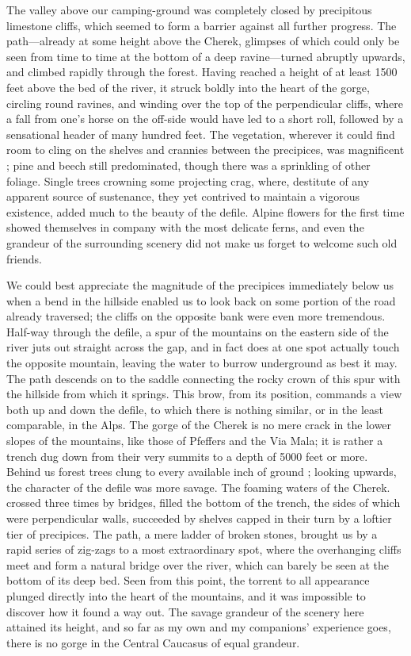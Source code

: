 \documentclass{article}
\begin{document}
	The valley above our camping-ground was completely closed by precipitous limestone cliffs, which seemed to form a barrier against all further progress. The path—already at some height above the Cherek, glimpses of which could only be seen from time to time at the bottom of a deep ravine—turned abruptly upwards, and climbed rapidly through the forest. Having reached a height of at least 1500 feet above the bed of the river, it struck boldly into the heart of the gorge, circling round ravines, and winding over the top of the perpendicular cliffs, where a fall from one's horse on the off-side would have led to a short roll, followed by a sensational header of many hundred feet. The vegetation, wherever it could find room to cling on the shelves and crannies between the precipices, was magnificent ; pine and beech still predominated, though there was a sprinkling of other foliage. Single trees crowning some projecting crag, where, destitute of any apparent source of sustenance, they yet contrived to maintain a vigorous existence, added much to the beauty of the defile. Alpine flowers for the first time showed themselves in company with the most delicate ferns, and even the grandeur of the surrounding scenery did not make us forget to welcome such old friends.
	
	We could best appreciate the magnitude of the precipices immediately below us when a bend in the hillside enabled us to look back on some portion of the road already traversed; the cliffs on the opposite bank were even more tremendous. Half-way through the defile, a spur of the mountains on the eastern side of the river juts out straight across the gap, and in fact does at one spot actually touch the opposite mountain, leaving the water to burrow underground as best it may. The path descends on to the saddle connecting the rocky crown of this spur with the hillside from which it springs. This brow, from its position, commands a view both up and down the defile, to which there is nothing similar, or in the least comparable, in the Alps. The gorge of the Cherek is no mere crack in the lower slopes of the mountains, like those of Pfeffers and the Via Mala; it is rather a trench dug down from their very summits to a depth of 5000 feet or more. Behind us forest trees clung to every available inch of ground ; looking upwards, the character of the defile was more savage. The foaming waters of the Cherek. crossed three times by bridges, filled the bottom of the trench, the sides of which were perpendicular walls, succeeded by shelves capped in their turn by a loftier tier of precipices. The path, a mere ladder of broken stones, brought us by a rapid series of zig-zags to a most extraordinary spot, where the overhanging cliffs meet and form a natural bridge over the river, which can barely be seen at the bottom of its deep bed. Seen from this point, the torrent to all appearance plunged directly into the heart of the mountains, and it was impossible to discover how it found a way out. The savage grandeur of the scenery here attained its height, and so far as my own and my companions' experience goes, there is no gorge in the Central Caucasus of equal grandeur.
	
\end{document}
